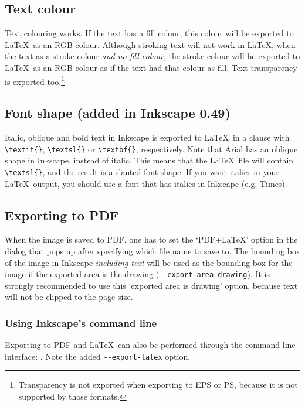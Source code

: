 \documentclass[final,3p,twocolumn]{elsarticle}
\begin{document}
\subsection{Text colour}
Text colouring works. If the text has a fill colour, this colour will be exported to \LaTeX\ as an RGB colour. Although stroking text will not work in \LaTeX, when the text as a stroke colour \emph{and no fill colour}, the stroke colour will be exported to \LaTeX\ as an RGB colour as if the text had that colour as fill. Text transparency is exported too.\footnote{Transparency is not exported when exporting to EPS or PS, because it is not supported by those formats.}

\subsection{Font shape (added in Inkscape 0.49)}
 Italic, oblique and bold text in Inkscape is exported to \LaTeX\ in a clause with {\small\verb|\textit{}|}, {\small\verb|\textsl{}|} or {\small\verb|\textbf{}|}, respectively.
Note that Arial has an oblique shape in Inkscape, instead of italic. This means that the \LaTeX\ file will contain {\small\verb|\textsl{}|}, and the result is a slanted font shape. If you want italics in your \LaTeX\ output, you should use a font that has italics in Inkscape (e.g. Times).

\subsection{Exporting to PDF}
When the image is saved to PDF, one has to set the `PDF+LaTeX' option in the dialog that pops up after specifying which file name to save to.
The bounding box of the image in Inkscape \emph{including text} will be used as the bounding box for the image if the exported area is the drawing ({\small\verb|--export-area-drawing|}). It is strongly recommended to use this `exported area is drawing' option, because text will not be clipped to the page size.

\subsubsection{Using Inkscape's command line}
\label{sct:cmdline}
Exporting to PDF and \LaTeX\ can also be performed through the command line interface:
{\small{}}.
Note the added {\small\verb|--export-latex|} option.
\end{document}
